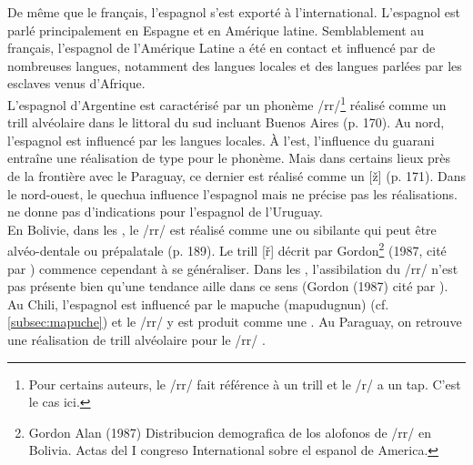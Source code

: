 De même que le français, l'espagnol s'est exporté à l'international.
L'espagnol est parlé principalement en Espagne et en Amérique latine. Semblablement au français, l'espagnol de l'Amérique Latine a été en contact et influencé par de nombreuses langues, notamment des langues locales et des langues parlées par les esclaves venus d'Afrique.\\


L'espagnol d'Argentine est caractérisé par un phonème /rr/\footnote{Pour certains auteurs, le /rr/ fait référence à un trill et le /r/ a un tap. C'est le cas ici.} réalisé comme un trill alvéolaire dans le littoral du sud incluant Buenos Aires (p. 170). Au nord, l'espagnol est influencé par les langues locales.
À l'est, l'influence du guarani entraîne une réalisation de type  pour le phonème. Mais dans certains lieux près de la frontière avec le Paraguay, ce dernier est réalisé comme un [ž] (p. 171).
Dans le nord-ouest, le quechua influence l'espagnol mais \textcite{lipski1994latin} ne précise pas les réalisations. \citeauthor{lipski1994latin} ne donne pas d'indications pour l'espagnol de l'Uruguay.\\

En Bolivie, dans les , le /rr/ est réalisé comme une  ou sibilante qui peut être alvéo-dentale ou prépalatale (p. 189). Le trill [ř] décrit par Gordon\footnote{Gordon Alan (1987) Distribucion demografica de los alofonos de /rr/ en Bolivia. Actas del I congreso International sobre el espanol de America.} (1987, cité par \citeauthor{lipski1994latin}) commence cependant à se généraliser. Dans les , l'assibilation du /rr/ n'est pas présente bien qu'une tendance aille dans ce sens (Gordon (1987) cité par \citeauthor{lipski1994latin}). Au Chili, l'espagnol est influencé par le mapuche (mapudugnun) (cf. \autoref{subsec:mapuche}) et le /rr/ y est produit comme une . Au Paraguay, on retrouve une réalisation de trill alvéolaire pour le /rr/ \parencite[308]{lipski1994latin}.\\

